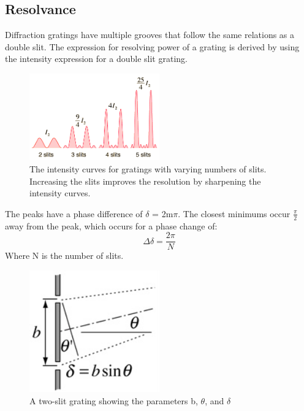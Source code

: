 \subsection{Resolvance} \label{sec:resolvance}
Diffraction gratings have multiple grooves that follow the same relations as a double slit. The expression for resolving power of a grating is derived by using the intensity expression for a double slit grating. 

\begin{figure}[H]
\centering
\includegraphics[width=0.5\textwidth]{figures/grating_intensity_curves.png}
\caption{The intensity curves for gratings with varying numbers of slits. Increasing the slits improves the resolution by sharpening the intensity curves.}
\label{fig:grating-intensity}
\end{figure}

The peaks have a phase difference of $\delta$ = 2m$\pi$. The closest minimums occur $\frac{\pi}{2}$ away from the peak, which occurs for a phase change of: 
\begin{equation}
\Delta \delta = \frac{2\pi}{N}
\end{equation}
Where N is the number of slits.

\begin{figure}[H]
\centering
\includegraphics[width=0.5\textwidth]{figures/grating-set-up.png}
\caption{A two-slit grating showing the parameters b, $\theta$, and $\delta$}
\label{fig:grating-set-up}
\end{figure}


